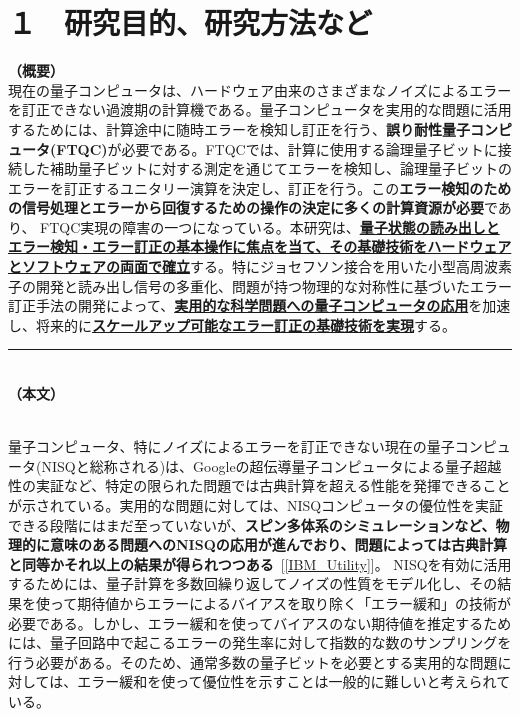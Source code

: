 \documentclass[11pt,a4j,dvipdfmx]{jarticle} 					%
\newcommand{\研究課題名}{誤り耐性量子コンピュータに向けた誤り訂正技術の開発(仮)}
\newcommand{\研究機関名}{東京大学}
\newcommand{\研究代表者氏名}{寺師弘二}
\newcommand{\研究期間の最終元号年度}{10}  %
\newcommand{\mybf}[1]{{\bfseries\sffamily#1}}
\begin{document}

\section{１　研究目的、研究方法など}

\noindent
\textbf{（概要）}\\
現在の量子コンピュータは、ハードウェア由来のさまざまなノイズによるエラーを訂正できない過渡期の計算機である。量子コンピュータを実用的な問題に活用するためには、計算途中に随時エラーを検知し訂正を行う、\mybf{誤り耐性量子コンピュータ(FTQC)}が必要である。FTQCでは、計算に使用する論理量子ビットに接続した補助量子ビットに対する測定を通じてエラーを検知し、論理量子ビットのエラーを訂正するユニタリー演算を決定し、訂正を行う。この\mybf{エラー検知のための信号処理とエラーから回復するための操作の決定に多くの計算資源が必要}であり、 FTQC実現の障害の一つになっている。本研究は、\mybf{\ul{量子状態の読み出しとエラー検知・エラー訂正の基本操作に焦点を当て、その基礎技術をハードウェアとソフトウェアの両面で確立}}する。特にジョセフソン接合を用いた小型高周波素子の開発と読み出し信号の多重化、問題が持つ物理的な対称性に基づいたエラー訂正手法の開発によって、\mybf{\ul{実用的な科学問題への量子コンピュータの応用}}を加速し、将来的に\mybf{\ul{スケールアップ可能なエラー訂正の基礎技術を実現}}する。

\noindent
\rule{\linewidth}{1pt}\\
\noindent
\textbf{（本文）}

\\
量子コンピュータ、特にノイズによるエラーを訂正できない現在の量子コンピュータ(NISQと総称される)は、Googleの超伝導量子コンピュータによる量子超越性の実証など、特定の限られた問題では古典計算を超える性能を発揮できることが示されている。実用的な問題に対しては、NISQコンピュータの優位性を実証できる段階にはまだ至っていないが、\mybf{スピン多体系のシミュレーションなど、物理的に意味のある問題へのNISQの応用が進んでおり、問題によっては古典計算と同等かそれ以上の結果が得られつつある}~[\ref{IBM_Utility}]。
NISQを有効に活用するためには、量子計算を多数回繰り返してノイズの性質をモデル化し、その結果を使って期待値からエラーによるバイアスを取り除く「エラー緩和」の技術が必要である。しかし、エラー緩和を使ってバイアスのない期待値を推定するためには、量子回路中で起こるエラーの発生率に対して指数的な数のサンプリングを行う必要がある。そのため、通常多数の量子ビットを必要とする実用的な問題に対しては、エラー緩和を使って優位性を示すことは一般的に難しいと考えられている。
\end{document}
